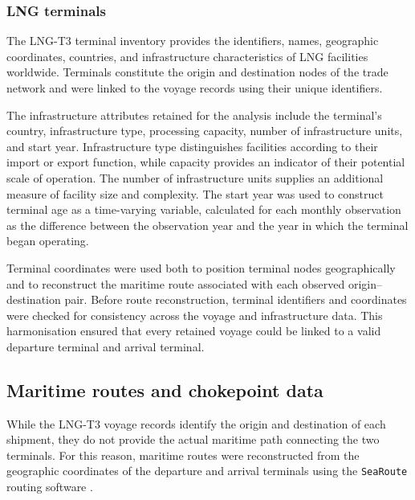 \documentclass[pdftex,12pt,openright,a4paper,oneside]{book}
\begin{document}
\subsubsection{LNG terminals}
\label{subsubsec:lng_terminals}
The LNG-T3 terminal inventory provides the identifiers, names, geographic coordinates, countries, and infrastructure characteristics of LNG facilities worldwide. Terminals constitute the origin and destination nodes of the trade network and were linked to the voyage records using their unique identifiers.

The infrastructure attributes retained for the analysis include the terminal's country, infrastructure type, processing capacity, number of infrastructure units, and start year. Infrastructure type distinguishes facilities according to their import or export function, while capacity provides an indicator of their potential scale of operation. The number of infrastructure units supplies an additional measure of facility size and complexity. The start year was used to construct terminal age as a time-varying variable, calculated for each monthly observation as the difference between the observation year and the year in which the terminal began operating.

Terminal coordinates were used both to position terminal nodes geographically and to reconstruct the maritime route associated with each observed origin--destination pair. Before route reconstruction, terminal identifiers and coordinates were checked for consistency across the voyage and infrastructure data. This harmonisation ensured that every retained voyage could be linked to a valid departure terminal and arrival terminal.

\subsection{Maritime routes and chokepoint data}
\label{subsec:routes_chokepoints_data}
While the LNG-T3 voyage records identify the origin and destination of each shipment, they do not provide the actual maritime path connecting the two terminals. 
For this reason, maritime routes were reconstructed from the geographic coordinates of the departure and arrival terminals using the \texttt{SeaRoute} routing software \citep{searoute}. 
\end{document}
